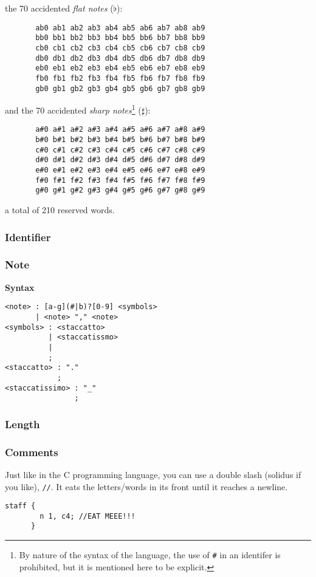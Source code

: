 the 70 accidented \textit{flat notes} ($\flat$):

\begin{verbatim}
       ab0 ab1 ab2 ab3 ab4 ab5 ab6 ab7 ab8 ab9
       bb0 bb1 bb2 bb3 bb4 bb5 bb6 bb7 bb8 bb9
       cb0 cb1 cb2 cb3 cb4 cb5 cb6 cb7 cb8 cb9
       db0 db1 db2 db3 db4 db5 db6 db7 db8 db9
       eb0 eb1 eb2 eb3 eb4 eb5 eb6 eb7 eb8 eb9
       fb0 fb1 fb2 fb3 fb4 fb5 fb6 fb7 fb8 fb9
       gb0 gb1 gb2 gb3 gb4 gb5 gb6 gb7 gb8 gb9
\end{verbatim}

and the 70 accidented \textit{sharp notes}\footnote{By nature of the syntax of
the language, the use of \protect\texttt{\#} in an identifer is prohibited,
but it is mentioned here to be explicit.} ($\sharp$):
\begin{verbatim}
       a#0 a#1 a#2 a#3 a#4 a#5 a#6 a#7 a#8 a#9
       b#0 b#1 b#2 b#3 b#4 b#5 b#6 b#7 b#8 b#9
       c#0 c#1 c#2 c#3 c#4 c#5 c#6 c#7 c#8 c#9
       d#0 d#1 d#2 d#3 d#4 d#5 d#6 d#7 d#8 d#9
       e#0 e#1 e#2 e#3 e#4 e#5 e#6 e#7 e#8 e#9
       f#0 f#1 f#2 f#3 f#4 f#5 f#6 f#7 f#8 f#9
       g#0 g#1 g#2 g#3 g#4 g#5 g#6 g#7 g#8 g#9
\end{verbatim}

a total of 210 reserved words.

\subsubsection{Identifier}


\subsubsection{Note}

\np \textbf{Syntax}

\begin{verbatim}
<note> : [a-g](#|b)?[0-9] <symbols>
       | <note> "," <note>
<symbols> : <staccatto>
          | <staccatissmo>
          |
          ;
<staccatto> : "."
            ;
<staccatissimo> : "_"
                ;
\end{verbatim}

\subsubsection{Length}

\subsubsection{Comments}
\np Just like in the C programming language, you can use a double slash (solidus if you like), \verb+//+.
It eats the letters/words in its front until it reaches a newline.
\begin{Verbatim}[frame=single]
      staff {
        n 1, c4; //EAT MEEE!!!
      }
\end{Verbatim}

